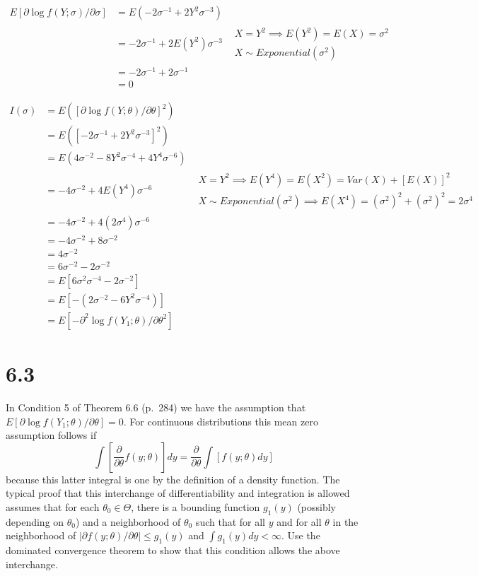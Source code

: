 \documentclass[
  letterpaper,
  DIV=11,
  numbers=noendperiod]{scrreprt}
\begin{document}
\[\begin{aligned}
E[\partial \log f(Y;\sigma)/\partial \sigma] &= E(- 2 \sigma^{-1} +2Y^2\sigma^{-3})\\
&= - 2 \sigma^{-1} +2E(Y^2)\sigma^{-3} &\substack{X= Y^2 \implies E(Y^2)= E(X) = \sigma^2\\ X \sim Exponential(\sigma^2)}\\
&= - 2 \sigma^{-1} +2\sigma^{-1}\\
&= 0
\end{aligned}\]

\[\begin{aligned}
I(\sigma) &= E([\partial \log f(Y;\theta)/\partial \theta]^2) \\
&= E([- 2 \sigma^{-1} +2Y^2\sigma^{-3}]^2)\\
&= E(4\sigma^{-2} -8Y^2\sigma^{-4} +4Y^4\sigma^{-6}) \\
&= -4\sigma^{-2} +4E(Y^4)\sigma^{-6} & \substack{X= Y^2 \implies E(Y^4)= E(X^2) = Var(X) + [E(X)]^2\\ X \sim Exponential(\sigma^2) \implies E(X^4) = (\sigma^2)^2+(\sigma^2)^2=2\sigma^4}\\
&= -4\sigma^{-2} +4(2\sigma^{4})\sigma^{-6} \\
&= -4\sigma^{-2} +8\sigma^{-2}\\
&= 4\sigma^{-2} \\
&= 6\sigma^{-2}-2\sigma^{-2} \\
&= E[6\sigma^2\sigma^{-4}-2\sigma^{-2}]\\
&= E[-(2\sigma^{-2}-6Y^2\sigma^{-4})]\\
&= E[-\partial^2 \log f(Y_1;\theta)/\partial \theta^2]
\end{aligned}\]

\newpage

\hypertarget{section-42}{%
\section{6.3}\label{section-42}}

In Condition 5 of Theorem 6.6 (p.~284) we have the assumption that
\(E[\partial \log f(Y_1;\theta)/\partial \theta] = 0\). For continuous
distributions this mean zero assumption follows if
\[\int\left[\frac \partial {\partial \theta} f(y;\theta)\right] dy=\frac \partial {\partial \theta}\int\left[ f(y;\theta)dy\right] \]
because this latter integral is one by the definition of a density
function. The typical proof that this interchange of differentiability
and integration is allowed assumes that for each
\(\theta_0 \in \Theta\), there is a bounding function \(g_1(y)\)
(possibly depending on \(\theta_0\)) and a neighborhood of \(\theta_0\)
such that for all \(y\) and for all \(\theta\) in the neighborhood of
\(|\partial f(y;\theta)/\partial \theta| \leq g_1(y)\) and
\(\int g_1(y)dy < \infty\). Use the dominated convergence theorem to
show that this condition allows the above interchange.
\end{document}
